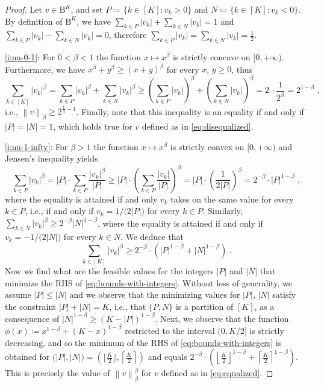 \documentclass[11pt,oneside,a4paper]{article}
\newcommand{\lrb}[1]{\left(#1\right)}
\newcommand{\brb}[1]{\bigl(#1\bigr)}
\newcommand{\lno}[1]{\left\lVert#1\right\rVert}
\theoremstyle{plain}
\theoremstyle{definition}
\theoremstyle{remark}
\newcommand{\tsphere}[1]{\mathrm{B}^{#1}}
\begin{document}
\begin{proof}
Let $v \in \tsphere{K}$, and set $P \coloneq \{k \in [K]: v_k >0\}$ and $N \coloneq \{k \in [K]: v_k < 0\}$. By definition of $\tsphere{K}$, we have $\sum_{k \in P} |v_k| + \sum_{k \in N} |v_k| = 1$ and
$\sum_{k \in P} |v_k| - \sum_{k \in N} |v_k| = 0$, therefore $\sum_{k \in P} |v_k| = \sum_{k \in N} |v_k| = \frac{1}{2}$. 

\ref{i:nu-0-1}: For $0 < \beta <  1$ the function $x \mapsto x^{\beta}$ is strictly concave on $[0,+\infty)$.
Furthermore, we have $x^\beta + y^{\beta} \geq (x + y)^\beta$ for every $x$, $y \geq 0$, thus
\[
    \sum_{k \in [K] } |v_k|^{\beta}
=
    \sum_{k \in P } |v_k|^{\beta}
+
    \sum_{k \in N } |v_k|^{\beta}
\ge
    \lrb{\sum_{k \in P } |v_k|}^{\beta}
+
    \lrb{\sum_{k \in N } |v_k|}^{\beta}
= 2 \,\cdot \frac{1}{2^{\beta}} = 2^{1 - \beta}\;,    
\]
i.e., $\lno{v}_{\beta} \ge 2^{\frac{1}{\beta} - 1}$.
Finally, note that this inequality is an equality if and only if $|P|=|N|=1$, which holds true for $v$ defined as in \eqref{eq:disequalized}.

\ref{i:nu-1-infty}: For $\beta > 1$ the  function $x \mapsto x^{\beta}$ is strictly convex on $[0,+\infty)$ and Jensen's inequality yields 
\begin{equation}\label{eq:distribute}
    \sum_{k \in P } |v_k|^{\beta}
=
    |P| \cdot \sum_{k \in P } \frac{{|v_k|}^{\beta}}{|P|}
\ge 
    |P| \cdot \lrb{ \sum_{k \in P } \frac{|v_k|}{|P|}}^{\beta}
=
    |P| \cdot \lrb{\frac{1}{2|P|}}^{\beta}
=
    2^{-\beta}\cdot  |P|^{1 - \beta}\;,
\end{equation}
where the equality is attained if and only $v_k$ takes on the same value for every $k \in P$, i.e., if and only if $v_k = 1/\brb{2|P|}$ for every $k \in P$.
Similarly,
    $\sum_{k \in N } |v_k|^{\beta}
    \ge
    2^{-\beta} |N|^{1 - \beta} $,
where the equality is attained if and only if $v_k = -1/\brb{2|N|}$ for every $k \in N$.
We deduce that
\begin{equation}\label{eq:bounds-with-integers}    
    \sum_{k \in [K]} |v_k|^{\beta}
\ge
    2^{-\beta}\cdot \lrb{ |P|^{1 - \beta} +  |N|^{1 - \beta}}\;.
\end{equation}
Now we find what are the feasible values for the integers $|P|$ and $|N|$ that minimize the RHS of \eqref{eq:bounds-with-integers}. Without loss of generality, we assume $|P| \leq |N|$ and we observe that the minimizing values for $|P|$, $|N|$ satisfy the constraint $|P| + |N| = K$, i.e., that $\{ P, N\}$ is a partition of $[K]$, as a consequence of $|N|^{1 -   \beta} \geq (K - |P|)^{1 - \beta}$. 
Next, we observe that the function $\phi(x) \coloneq x^{1 -\beta} + (K - x)^{1- \beta}$ restricted to the interval $(0, K/2]$ is strictly decreasing, and so the minimum of the RHS of \eqref{eq:bounds-with-integers} is obtained for $\brb{|P|, |N|} = \lrb{\lfloor \frac{K}{2}\rfloor,\left\lceil \frac{K}{2} \right\rceil}$ and equals ${ 2^{-\beta}} \cdot \lrb{{\left\lfloor \frac{K}{2}\right\rfloor}^{1 - \beta} +  {\left\lceil \frac{K}{2} \right\rceil}^{1 - \beta}}$. This is precisely the value of $\lno{v}_{\beta}^{\beta}$ for $v$ defined as in \eqref{eq:equalized}.  
\end{proof}
\end{document}
